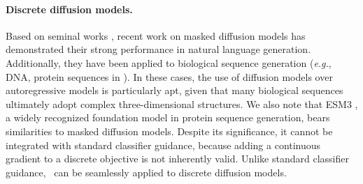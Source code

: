 \vspace{-2mm}
\paragraph{Discrete diffusion models.} Based on seminal works \citet{austin2021structured,campbell2022continuous}, recent work on masked diffusion models \citep{lou2023discrete,shi2024simplified,sahoo2024simple} has demonstrated their strong performance in natural language generation. Additionally, they have been applied to biological sequence generation (\textit{e.g.}, DNA, protein sequences in \citet{campbell2024generative,sarkar2024designing}). In these cases, the use of diffusion models over autoregressive models is particularly apt, given that many biological sequences ultimately adopt complex three-dimensional structures. We also note that ESM3 \citep{hayes2024simulating}, a widely recognized foundation model in protein sequence generation, bears similarities to masked diffusion models. Despite its significance, it cannot be integrated with standard classifier guidance, because adding a continuous gradient to a discrete objective is not inherently valid. Unlike standard classifier guidance, \alg\ can be seamlessly applied to discrete diffusion models.





